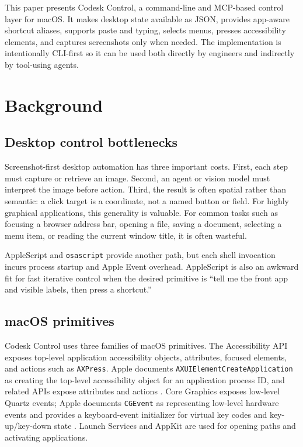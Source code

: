 \documentclass[11pt]{article}
\begin{document}
This paper presents Codesk Control, a command-line and MCP-based control layer for macOS. It makes desktop state available as JSON, provides app-aware shortcut aliases, supports paste and typing, selects menus, presses accessibility elements, and captures screenshots only when needed. The implementation is intentionally CLI-first so it can be used both directly by engineers and indirectly by tool-using agents.

\section{Background}

\subsection{Desktop control bottlenecks}

Screenshot-first desktop automation has three important costs. First, each step must capture or retrieve an image. Second, an agent or vision model must interpret the image before action. Third, the result is often spatial rather than semantic: a click target is a coordinate, not a named button or field. For highly graphical applications, this generality is valuable. For common tasks such as focusing a browser address bar, opening a file, saving a document, selecting a menu item, or reading the current window title, it is often wasteful.

AppleScript and \texttt{osascript} provide another path, but each shell invocation incurs process startup and Apple Event overhead. AppleScript is also an awkward fit for fast iterative control when the desired primitive is ``tell me the front app and visible labels, then press a shortcut.''

\subsection{macOS primitives}

Codesk Control uses three families of macOS primitives. The Accessibility API exposes top-level application accessibility objects, attributes, focused elements, and actions such as \texttt{AXPress}. Apple documents \texttt{AXUIElementCreateApplication} as creating the top-level accessibility object for an application process ID, and related APIs expose attributes and actions \cite{apple-ax}. Core Graphics exposes low-level Quartz events; Apple documents \texttt{CGEvent} as representing low-level hardware events and provides a keyboard-event initializer for virtual key codes and key-up/key-down state \cite{apple-cgevent,apple-keyboard}. Launch Services and AppKit are used for opening paths and activating applications.
\end{document}
